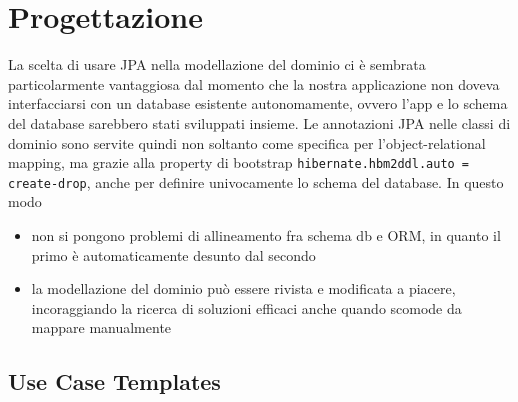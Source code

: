 \section{Progettazione}
La scelta di usare JPA nella modellazione del dominio ci è sembrata particolarmente vantaggiosa
dal momento che la nostra applicazione non doveva interfacciarsi con un database esistente autonomamente,
ovvero l'app e lo schema del database sarebbero stati sviluppati insieme. 
Le annotazioni JPA nelle classi di dominio
sono servite quindi non soltanto come specifica per l'object-relational mapping, ma grazie alla property
di bootstrap \texttt{hibernate.hbm2ddl.auto = create-drop}, anche per definire univocamente lo schema del database.
In questo modo 
\begin{itemize}
    \item non si pongono problemi di allineamento fra schema db e ORM, in quanto il primo
        è automaticamente desunto dal secondo
    \item la modellazione del dominio può essere rivista e modificata a piacere, incoraggiando
        la ricerca di soluzioni efficaci anche quando scomode da mappare manualmente
\end{itemize}



\subsection{Use Case Templates}

